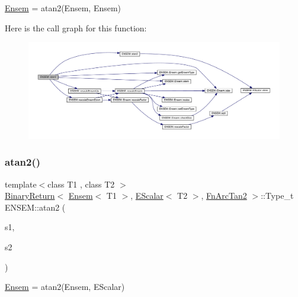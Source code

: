 \mbox{\hyperlink{classENSEM_1_1Ensem}{Ensem}} = atan2(\+Ensem, Ensem) 

Here is the call graph for this function\+:\nopagebreak
\begin{figure}[H]
\begin{center}
\leavevmode
\includegraphics[width=350pt]{d1/d9e/group__eensem_ga4a9f9b7400c5d7cbbb6f6118ca6a3c47_cgraph}
\end{center}
\end{figure}
\mbox{\label{group__eensem_gabe797638db840fa2cddca1e1d133fc55}} 
\subsubsection{\texorpdfstring{atan2()}{atan2()}\hspace{0.1cm}{\footnotesize\ttfamily [2/3]}}
{\footnotesize\ttfamily template$<$class T1 , class T2 $>$ \\
\mbox{\hyperlink{structENSEM_1_1BinaryReturn}{Binary\+Return}}$<$ \mbox{\hyperlink{classENSEM_1_1Ensem}{Ensem}}$<$ T1 $>$, \mbox{\hyperlink{classENSEM_1_1EScalar}{E\+Scalar}}$<$ T2 $>$, \mbox{\hyperlink{structENSEM_1_1FnArcTan2}{Fn\+Arc\+Tan2}} $>$\+::Type\+\_\+t E\+N\+S\+E\+M\+::atan2 (\begin{DoxyParamCaption}\item[{const \mbox{\hyperlink{classENSEM_1_1Ensem}{Ensem}}$<$ T1 $>$ \&}]{s1,  }\item[{const \mbox{\hyperlink{classENSEM_1_1EScalar}{E\+Scalar}}$<$ T2 $>$ \&}]{s2 }\end{DoxyParamCaption})\hspace{0.3cm}{\ttfamily [inline]}}



\mbox{\hyperlink{classENSEM_1_1Ensem}{Ensem}} = atan2(\+Ensem, E\+Scalar) 

